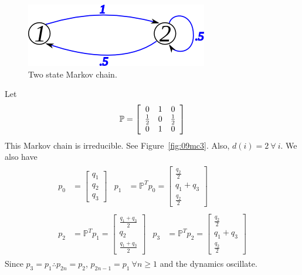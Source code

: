 \begin{figure}[ht!]
\centering
\includegraphics[width=.4\textwidth]{images/09mc2}
\caption{Two state Markov chain.}
\label{fig:09mc2}
\end{figure}

\begin{example}
Let
$$\mathbb{P} = \left[\begin{array}{c c c} 0 & 1 & 0 \\ \frac{1}{2} & 0 & \frac{1}{2} \\ 0 & 1 & 0 \end{array}\right]$$
This Markov chain is irreducible.
See Figure~\ref{fig:09mc3}.
Also, $d (i)=2~\forall~i$.
We also have
\begin{align*}
\begin{split}
p_0 &= \left[\begin{array}{c} q_1 \\ q_2 \\ q_3 \end{array}\right]
\end{split}
\begin{split}
p_1 &= \mathbb{P}^Tp_0 = \left[\begin{array}{c} \frac{q_2}{2} \\ q_1+q_3 \\ \frac{q_2}{2} \end{array}\right]
\end{split} \\
\begin{split}
p_2 &= \mathbb{P}^Tp_1 = \left[\begin{array}{c} \frac{q_1+q_3}{2} \\ q_2 \\ \frac{q_1+q_3}{2} \end{array}\right]
\end{split}
\begin{split}
p_3 &= \mathbb{P}^Tp_2 = \left[\begin{array}{c} \frac{q_2}{2} \\ q_1+q_3 \\ \frac{q_2}{2} \end{array}\right]
\end{split}
\end{align*}
Since $p_3=p_1 \therefore p_{2n}=p_2$, $p_{2n-1}=p_1~\forall n\geq1$ and the dynamics oscillate.

\end{example}
